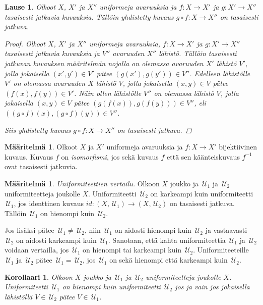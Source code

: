 \documentclass[12pt,a4paper,leqno]{report}
\newcommand{\U}{\,\mathcal{U}}
\theoremstyle{plain}
\newtheorem{lause}[equation]{Lause}
\newtheorem{kor}[equation]{Korollaari}
\theoremstyle{definition}
\newtheorem{maar}[equation]{Määritelmä}
\theoremstyle{remark}
\begin{document}
\begin{lause}
Olkoot $X$, $X'$ ja $X''$ uniformeja avaruuksia 
ja $f\colon X\rightarrow X'$ ja $g\colon X'\rightarrow X''$ 
tasaisesti jatkuvia kuvauksia. 
Tällöin yhdistetty kuvaus $g\circ f\colon X\rightarrow X''$ on tasaisesti jatkuva.
\begin{proof}
Olkoot $X$, $X'$ ja $X''$ uniformeja avaruuksia, 
$f\colon X\rightarrow X'$ ja $g\colon X'\rightarrow X''$ tasaisesti jatkuvia kuvauksia ja 
$V''$ avaruuden $X''$ lähistö. 
Tällöin tasaisesti jatkuvan kuvauksen määritelmän nojalla 
on olemassa avaruuden $X'$ lähistö $V'$, 
jolla jokaisella $(x',y')\in V'$ pätee $ (g(x'),g(y'))\in V''$.
Edelleen lähistölle $V'$ on olemassa avaruuden $X$ lähistö $V$, 
jolla jokaisella $(x,y)\in V$ pätee $ (f(x),f(y))\in V'$.
Näin ollen lähistölle $V''$ on olemassa lähistö $V$, 
jolla jokaisella $(x,y)\in V$ pätee $ (g(f(x)),g(f(y)))\in V''$, 
eli $ ((g\circ f)(x),(g\circ f)(y))\in V''$.

Siis yhdistetty kuvaus $g\circ f\colon X\rightarrow X''$ on tasaisesti jatkuva.
\end{proof}
\end{lause}
\begin{maar}
Olkoot $X$ ja $X'$ uniformeja avaruuksia 
ja $f\colon X\rightarrow X'$ bijektiivinen kuvaus. 
Kuvaus $f$ on \emph{isomorfismi}, jos sekä kuvaus $f$ että sen 
käänteiskuvaus $f^{-1}$ ovat tasaisesti jatkuvia.
\end{maar}
\begin{maar}\label{uniformi_vertailu}
\emph{Uniformiteettien vertailu.} 
Olkoon $X$ joukko ja $\U_1$ ja $\U_2$ uniformiteetteja joukolle $X$. 
Uniformiteetti $\U_2$ on karkeampi kuin uniformiteetti $\U_1$, 
jos identtinen kuvaus $id\colon (X,\U_1)\rightarrow (X,\U_2)$ on tasaisesti jatkuva. Tällöin $\U_1$ on hienompi kuin $\U_2$. 

Jos lisäksi pätee $\U_1\neq\U_2$, niin $\U_1$ on aidosti hienompi kuin $\U_2$ ja vastaavasti $\U_2$ on aidosti karkeampi kuin $\U_1$. 
Sanotaan, että kahta uniformiteettia $\U_1$ ja $\U_2$ voidaan vertailla, 
jos $\U_1$ on hienompi tai karkeampi kuin $\U_2$. 
Uniformiteeteille $\U_1$ ja $\U_2$ pätee $\U_1=\U_2$, 
jos $\U_1$ on sekä hienompi että karkeampi kuin $\U_2$.
\end{maar}
\begin{kor}
Olkoon $X$ joukko ja $\U_1$ ja $\U_2$ uniformiteetteja joukolle $X$. 
Uniformiteetti $\U_1$ on hienompi kuin uniformiteetti $\U_2$ jos ja vain jos jokaisella lähistöllä $V\in\U_2$ pätee $V\in\U_1$.
\end{kor}
\end{document}
